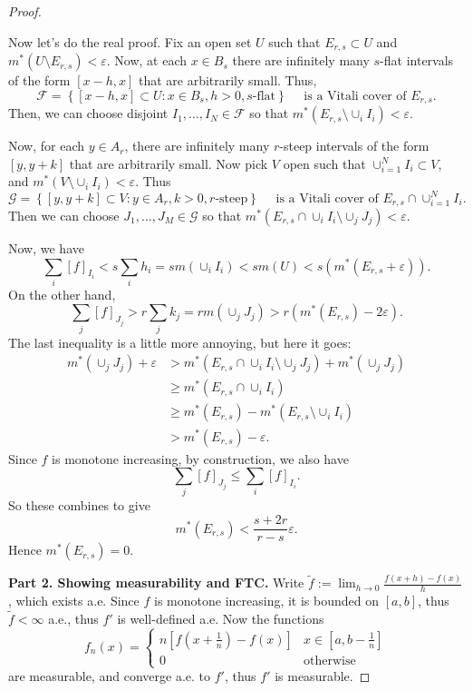 \begin{proof}
\begin{observation}
	\end{observation}

	Now let's do the real proof. Fix an open set $U$ such that $E_{r, s} \subset U$ and $m^*(U \setminus E_{r, s}) < \varepsilon$. Now, at each $x \in B_s$ there are infinitely many $s$-flat intervals of the form $[x - h, x]$ that are arbitrarily small. Thus,
	\[
		\mathcal{F} = \left\{ [x - h, x] \subset U: x \in B_s, h > 0, s \text{-flat}  \right\} \quad \text{ is a Vitali cover of $E_{r, s}$}
	.\] 
	Then, we can choose disjoint $I_1, \ldots, I_N \in \mathcal{F}$ so that $m^*\left( E_{r, s} \setminus \cup_i I_i \right) < \varepsilon$.

	Now, for each $y \in A_r$, there are infinitely many $r$-steep intervals of the form $[y, y + k]$ that are arbitrarily small. Now pick $V$ open such that $\cup _{i = 1}^N I_i \subset V$, and $m^*\left( V \setminus \cup _i I_i \right) < \varepsilon$. Thus
	\[
		\mathcal{G} = \left\{ [y, y+k] \subset V:y \in A_r, k > 0, r\text{-steep} \right\} \quad \text{ is a Vitali cover of }E_{r, s} \cap \cup_{i = 1} ^N I_i
	.\] 
	Then we can choose $J_1, \ldots, J_M \in \mathcal{G}$ so that $m^*\left( E_{r, s} \cap \cup _i I_i \setminus \cup _j J_j \right)  < \varepsilon$.

	Now, we have
	\[
		\sum_{i} [f]_{I_i} < s \sum_i h_i = s m\left( \cup _i I_i \right) < s m(U) < s\left( m^*(E_{r, s} + \varepsilon) \right) 
	.\] 
	On the other hand,
	\[
		\sum_j [f]_{J_j} > r \sum_j k_j = r m\left( \cup _j J_j \right)  > r\left( m^*\left( E_{r, s} \right)  - 2 \varepsilon\right)
	.\] 
	The last inequality is a little more annoying, but here it goes:
	\begin{align*}
		m^*(\cup _j J_j) + \varepsilon 
		&> m^*\left( E_{r, s} \cap  \cup _i I_i \setminus \cup _j J_j \right)  + m^*(\cup _j J_j) \\
		&\geq m^*\left( E_{r, s} \cap \cup _i I_i \right)  \\
		&\ge m^*\left( E_{r, s} \right)  - m^*\left( E_{r, s} \setminus  \cup _i I_i \right)  \\
		&> m^*\left( E_{r, s} \right)  - \varepsilon
	.\end{align*}
	Since $f$ is monotone increasing, by construction, we also have
	\[
		\sum_j [f]_{J_j} \le \sum_i [f] _{I_i}
	.\] 
	So these combines to give
	\[
		m^*(E_{r, s}) < \frac{s + 2 r}{r - s} \varepsilon
	.\] 
	Hence $m^*(E_{r, s}) = 0$.
	

	\textbf{Part 2. Showing measurability and FTC.} Write $\tilde f := \lim_{h \to 0} \frac{f(x + h) - f(x)}{h}$, which exists a.e. Since $f$ is monotone increasing, it is bounded on $[a, b]$, thus $\tilde f < \infty $ a.e., thus $f'$ is well-defined a.e. Now the functions
	\[
		f_n(x) = \begin{cases}
			n \left[ f(x + \frac{1}{n}) - f(x) \right] & x \in [a, b - \frac{1}{n}] \\
			0 & \text{otherwise}
		\end{cases}
	\] 
	are measurable, and converge a.e. to $f'$, thus $f'$ is measurable.


\end{proof}
